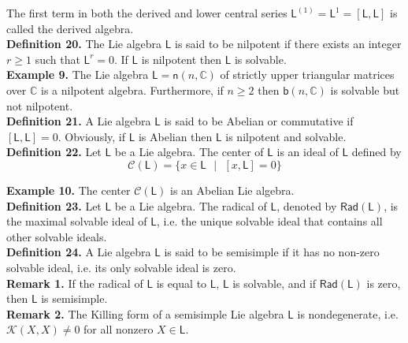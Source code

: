 \documentclass[11pt,a4paper]{article}
\begin{document}
The first term in both the derived and lower central series
$\mathsf{L}^{(1)} = \mathsf{L}^1 = [\mathsf{L},\mathsf{L}]$
is called the derived algebra. \\

\textbf{Definition 20.} The Lie algebra $\mathsf{L}$ is said to be nilpotent if there exists an integer $r \geq 1$ such that $\mathsf{L}^{r} = 0$. If $\mathsf{L}$ is nilpotent then $\mathsf{L}$ is solvable.\\

\textbf{Example 9.} The Lie algebra $\mathsf{L} = \mathsf{n}(n,\mathbb{C})$ of strictly upper triangular matrices over $\mathbb{C}$ is a nilpotent algebra. Furthermore, if $n \geq 2$ then $\mathsf{b}(n,\mathbb{C})$ is solvable but not nilpotent.\\

\textbf{Definition 21.} A Lie algebra $\mathsf{L}$ is said to be Abelian or commutative if $[\mathsf{L},\mathsf{L}] = 0$. Obviously, if $\mathsf{L}$ is Abelian then $\mathsf{L}$ is nilpotent and solvable.
\\

\textbf{Definition 22.} Let $\mathsf{L}$ be a Lie algebra. The center of $\mathsf{L}$ is an ideal of $\mathsf{L}$ defined by 
$$ \mathcal{C}(\mathsf{L}) = \{ x \in \mathsf{L} \text{ } \vert \text{ } [x,\mathsf{L}] = 0 \} $$

\textbf{Example 10.} The center $\mathcal{C}(\mathsf{L})$ is an Abelian Lie algebra.\\
 
\textbf{Definition 23.} Let $\mathsf{L}$ be a Lie algebra. The radical of $\mathsf{L}$, denoted by $\mathsf{Rad}(\mathsf{L})$, is the maximal solvable ideal of $\mathsf{L}$, i.e. the unique solvable ideal that contains all other solvable ideals.\\

\textbf{Definition 24.} A Lie algebra $\mathsf{L}$ is said to be semisimple if it has no non-zero solvable ideal, i.e. its only solvable ideal is zero.\\

\textbf{Remark 1.} If the radical  of $\mathsf{L}$ is equal to $\mathsf{L}$, $\mathsf{L}$ is solvable, and if $\mathsf{Rad}(\mathsf{L})$ is zero, then  $\mathsf{L}$ is semisimple.\\

\textbf{Remark 2.} The Killing form of a semisimple  Lie algebra $\mathsf{L}$ is nondegenerate, i.e.  $\mathcal{K} (X, X) \neq 0$ for all nonzero $X \in \mathsf{L}$.\\
\end{document}
